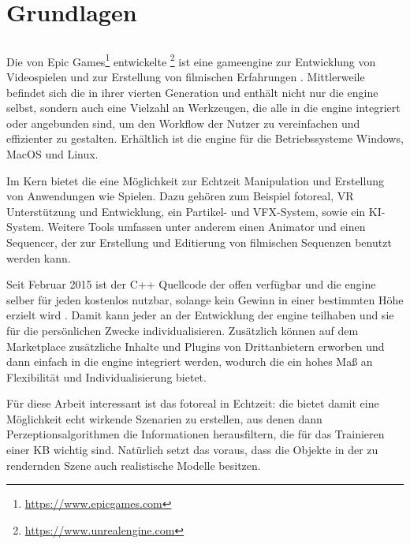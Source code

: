 \graphicspath{{./images/}}      
\def\CHAPTERONE{./chapters/Chapter-1} 

\chapter{Grundlagen}
\label{chap:software}
%	

\section{\unreal}
\label{sec:unrealengine}
Die von Epic Games\footnote{\url{https://www.epicgames.com}} entwickelte \unreal\footnote{\url{https://www.unrealengine.com}} ist eine \gls{gameengine} zur Entwicklung von Videospielen und zur Erstellung von filmischen Erfahrungen \cite{featUnreal}. Mittlerweile befindet sich die \unreal in ihrer vierten Generation und enthält nicht nur die \acrshort{engine} selbst, sondern auch eine Vielzahl an Werkzeugen, die alle in die \acrshort{engine} integriert oder angebunden sind, um den Workflow der Nutzer zu vereinfachen und effizienter zu gestalten. Erhältlich ist die \acrshort{engine} für die Betriebssysteme Windows, MacOS und Linux. \par

Im Kern bietet die \unreal eine Möglichkeit zur Echtzeit Manipulation und Erstellung von Anwendungen wie Spielen. Dazu gehören zum Beispiel \gls{fotoreal}, VR Unterstützung und Entwicklung, ein Partikel- und VFX-System, sowie ein KI-System. Weitere Tools umfassen unter anderem einen Animator und einen Sequencer, der zur Erstellung und Editierung von filmischen Sequenzen benutzt werden kann. \par 

Seit Februar 2015 ist der C++ Quellcode der \unreal offen verfügbar und die \acrshort{engine} selber für jeden kostenlos nutzbar, solange kein Gewinn in einer bestimmten Höhe erzielt wird \cite{freeUnreal}. Damit kann jeder an der Entwicklung der \acrshort{engine} teilhaben und sie für die persönlichen Zwecke individualisieren. Zusätzlich können auf dem Marketplace zusätzliche Inhalte und Plugins von Drittanbietern erworben und dann einfach in die \acrshort{engine} integriert werden, wodurch die \unreal ein hohes Maß an Flexibilität und Individualisierung bietet. \par 

Für diese Arbeit interessant ist das \gls{fotoreal} in Echtzeit: die \unreal bietet damit eine Möglichkeit echt wirkende Szenarien zu erstellen, aus denen dann Perzeptionsalgorithmen die Informationen herausfiltern, die für das Trainieren einer KB wichtig sind. Natürlich setzt das voraus, dass die Objekte in der zu rendernden Szene auch realistische Modelle besitzen.     

